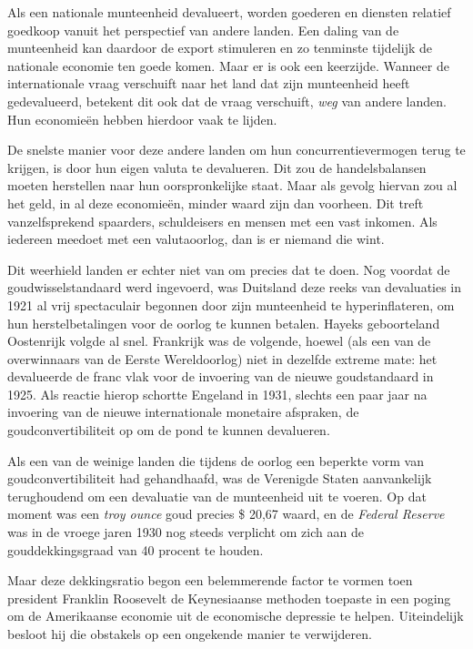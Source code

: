 \documentclass[
  a5paper,
  smalldemyvopaper,11pt,twoside,onecolumn,openright,extrafontsizes,
hidelinks]{memoir}
\begin{document}
Als een nationale munteenheid devalueert, worden goederen en diensten
relatief goedkoop vanuit het perspectief van andere landen. Een daling
van de munteenheid kan daardoor de export stimuleren en zo tenminste
tijdelijk de nationale economie ten goede komen. Maar er is ook een
keerzijde. Wanneer de internationale vraag verschuift naar het land dat
zijn munteenheid heeft gedevalueerd, betekent dit ook dat de vraag
verschuift, \emph{weg} van andere landen. Hun economieën hebben hierdoor
vaak te lijden.

De snelste manier voor deze andere landen om hun concurrentievermogen
terug te krijgen, is door hun eigen valuta te devalueren. Dit zou de
handelsbalansen moeten herstellen naar hun oorspronkelijke staat. Maar
als gevolg hiervan zou al het geld, in al deze economieën, minder waard
zijn dan voorheen. Dit treft vanzelfsprekend spaarders, schuldeisers en
mensen met een vast inkomen. Als iedereen meedoet met een valutaoorlog,
dan is er niemand die wint.

Dit weerhield landen er echter niet van om precies dat te doen. Nog
voordat de goudwisselstandaard werd ingevoerd, was Duitsland deze reeks
van devaluaties in 1921 al vrij spectaculair begonnen door zijn
munteenheid te hyperinflateren, om hun herstelbetalingen voor de oorlog
te kunnen betalen. Hayeks geboorteland Oostenrijk volgde al snel.
Frankrijk was de volgende, hoewel (als een van de overwinnaars van de
Eerste Wereldoorlog) niet in dezelfde extreme mate: het devalueerde de
franc vlak voor de invoering van de nieuwe goudstandaard in 1925. Als
reactie hierop schortte Engeland in 1931, slechts een paar jaar na
invoering van de nieuwe internationale monetaire afspraken, de
goudconvertibiliteit op om de pond te kunnen devalueren.

Als een van de weinige landen die tijdens de oorlog een beperkte vorm
van goudconvertibiliteit had gehandhaafd, was de Verenigde Staten
aanvankelijk terughoudend om een devaluatie van de munteenheid uit te
voeren. Op dat moment was een \emph{troy ounce} goud precies \$ 20,67
waard, en de \emph{Federal Reserve} was in de vroege jaren 1930 nog
steeds verplicht om zich aan de gouddekkingsgraad van 40 procent te
houden.

Maar deze dekkingsratio begon een belemmerende factor te vormen toen
president Franklin Roosevelt de Keynesiaanse methoden toepaste in een
poging om de Amerikaanse economie uit de economische depressie te
helpen. Uiteindelijk besloot hij die obstakels op een ongekende manier
te verwijderen.
\end{document}

